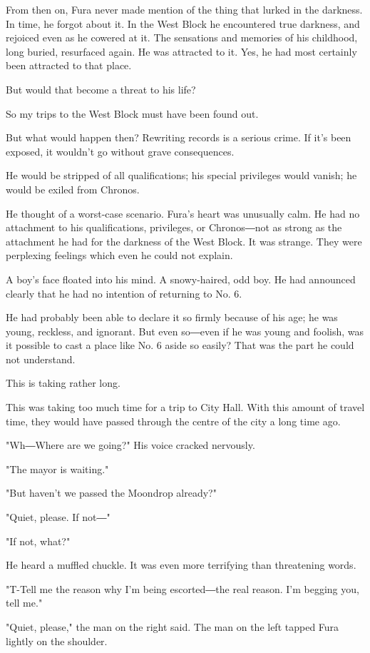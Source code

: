 From then on, Fura never made mention of the thing that lurked in the
darkness. In time, he forgot about it. In the West Block he encountered
true darkness, and rejoiced even as he cowered at it. The sensations and
memories of his childhood, long buried, resurfaced again. He was
attracted to it. Yes, he had most certainly been attracted to that
place.

But would that become a threat to his life?

So my trips to the West Block must have been found out.

But what would happen then? Rewriting records is a serious crime. If
it's been exposed, it wouldn't go without grave consequences.

He would be stripped of all qualifications; his special privileges would
vanish; he would be exiled from Chronos.

He thought of a worst-case scenario. Fura's heart was unusually calm. He
had no attachment to his qualifications, privileges, or Chronos―not as
strong as the attachment he had for the darkness of the West Block. It
was strange. They were perplexing feelings which even he could not
explain.

A boy's face floated into his mind. A snowy-haired, odd boy. He had
announced clearly that he had no intention of returning to No. 6.

He had probably been able to declare it so firmly because of his age; he
was young, reckless, and ignorant. But even so―even if he was young and
foolish, was it possible to cast a place like No. 6 aside so easily?
That was the part he could not understand.

This is taking rather long.

This was taking too much time for a trip to City Hall. With this amount
of travel time, they would have passed through the centre of the city a
long time ago.

"Wh―Where are we going?" His voice cracked nervously.

"The mayor is waiting."

"But haven't we passed the Moondrop already?"

"Quiet, please. If not―"

"If not, what?"

He heard a muffled chuckle. It was even more terrifying than threatening
words.

"T-Tell me the reason why I'm being escorted―the real reason. I'm
begging you, tell me."

"Quiet, please," the man on the right said. The man on the left tapped
Fura lightly on the shoulder.


